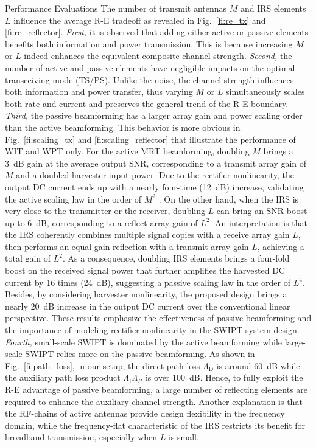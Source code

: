 \documentclass[journal]{IEEEtran}
\begin{document}
\begin{section}{Performance Evaluations}
		The number of transmit antennas $M$ and IRS elements $L$ influence the average R-E tradeoff as revealed in Fig.~\ref{fi:re_tx} and \ref{fi:re_reflector}. \textit{First,} it is observed that adding either active or passive elements benefits both information and power transmission. This is because increasing $M$ or $L$ indeed enhances the equivalent composite channel strength. \textit{Second,} the number of active and passive elements have negligible impacts on the optimal transceiving mode (TS/PS). Unlike the noise, the channel strength influences both information and power transfer, thus varying $M$ or $L$ simultaneously scales both rate and current and preserves the general trend of the R-E boundary. \textit{Third,} the passive beamforming has a larger array gain and power scaling order than the active beamforming. This behavior is more obvious in Fig.~\ref{fi:scaling_tx} and \ref{fi:scaling_reflector} that illustrate the performance of WIT and WPT only. For the active MRT beamforming, doubling $M$ brings a \SI{3}{\dB} gain at the average output SNR, corresponding to a transmit array gain of $M$ and a doubled harvester input power. Due to the rectifier nonlinearity, the output DC current ends up with a nearly four-time (\SI{12}{\dB}) increase, validating the active scaling law in the order of $M^2$ \cite{Clerckx2016a}. On the other hand, when the IRS is very close to the transmitter or the receiver, doubling $L$ can bring an SNR boost up to \SI{6}{\dB}, corresponding to a reflect array gain of $L^2$. An interpretation is that the IRS coherently combines multiple signal copies with a receive array gain $L$, then performs an equal gain reflection with a transmit array gain $L$, achieving a total gain of $L^2$. As a consequence, doubling IRS elements brings a four-fold boost on the received signal power that further amplifies the harvested DC current by \num{16} times (\SI{24}{\dB}), suggesting a passive scaling law in the order of $L^4$. Besides, by considering harvester nonlinearity, the proposed design brings a nearly \SI{20}{\dB} increase in the output DC current over the conventional linear perspective. These results emphasize the effectiveness of passive beamforming and the importance of modeling rectifier nonlinearity in the SWIPT system design. \textit{Fourth,} small-scale SWIPT is dominated by the active beamforming while large-scale SWIPT relies more on the passive beamforming. As shown in Fig.~\ref{fi:path_loss}, in our setup, the direct path loss $\Lambda_\mathrm{D}$ is around \SI{60}{\dB} while the auxiliary path loss product $\Lambda_{\mathrm{I}}\Lambda_R$ is over \SI{100}{\dB}. Hence, to fully exploit the R-E advantage of passive beamforming, a large number of reflecting elements are required to enhance the auxiliary channel strength. Another explanation is that the RF-chains of active antennas provide design flexibility in the frequency domain, while the frequency-flat characteristic of the IRS restricts its benefit for broadband transmission, especially when $L$ is small.


\end{section}
\end{document}

